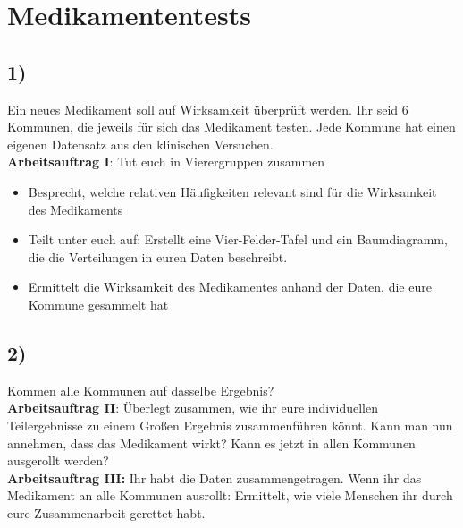 \documentclass[]{article}
\begin{document}
\section*{Medikamententests}

\subsection*{1)}
Ein neues Medikament soll auf Wirksamkeit überprüft werden. Ihr seid 6 Kommunen, die jeweils für sich das Medikament testen. Jede Kommune hat einen eigenen Datensatz aus den klinischen Versuchen.\\

\textbf{Arbeitsauftrag I}: Tut euch in Vierergruppen zusammen
\begin{itemize}
	\item Besprecht, welche relativen Häufigkeiten relevant sind für die Wirksamkeit des Medikaments
	\item Teilt unter euch auf: Erstellt eine Vier-Felder-Tafel und ein Baumdiagramm, die die Verteilungen in euren Daten beschreibt.
	\item Ermittelt die Wirksamkeit des Medikamentes anhand der Daten, die eure Kommune gesammelt hat
\end{itemize} 

\subsection*{2)}
Kommen alle Kommunen auf dasselbe Ergebnis?\\

\textbf{Arbeitsauftrag II}: Überlegt zusammen, wie ihr eure individuellen Teilergebnisse zu einem Großen Ergebnis zusammenführen könnt. Kann man nun annehmen, dass das Medikament wirkt? Kann es jetzt in allen Kommunen ausgerollt werden?\\

\textbf{Arbeitsauftrag III:} Ihr habt die Daten zusammengetragen. Wenn ihr das Medikament an alle Kommunen ausrollt: Ermittelt, wie viele Menschen ihr durch eure Zusammenarbeit gerettet habt.

\newpage
\end{document}
